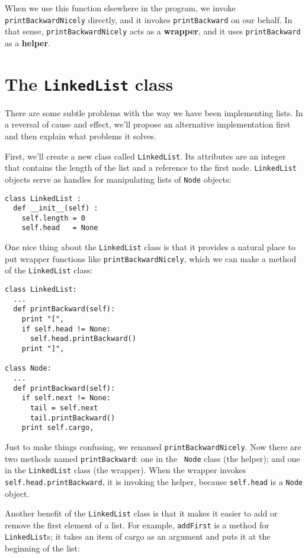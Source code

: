 When we use this function elsewhere in the program, we
invoke {\tt printBackwardNicely} directly, and it invokes
{\tt printBackward} on our behalf.  In that sense,
{\tt printBackwardNicely} acts as a {\bf wrapper}, and it uses
{\tt printBackward} as a {\bf helper}.


\section {The {\tt LinkedList} class}

There are some subtle problems with the way we have been
implementing lists.  In a reversal of cause and effect, we'll
propose an alternative implementation first and then explain what
problems it solves.

First, we'll create a new class called {\tt LinkedList}.  Its
attributes are an integer that contains the length of the list
and a reference to the first node.  {\tt LinkedList} objects
serve as handles for manipulating lists of {\tt Node} objects:

\beforeverb
\begin{verbatim}
class LinkedList :
  def __init__(self) :
    self.length = 0
    self.head   = None
\end{verbatim}
\afterverb
%
One nice thing about the {\tt LinkedList} class is that it provides
a natural place to put wrapper functions like
{\tt printBackwardNicely}, which we can make a
method of the {\tt LinkedList} class:

\beforeverb
\begin{verbatim}
class LinkedList:
  ...
  def printBackward(self):
    print "[",
    if self.head != None:
      self.head.printBackward()
    print "]",

class Node:
  ...
  def printBackward(self):
    if self.next != None:
      tail = self.next
      tail.printBackward()
    print self.cargo,
\end{verbatim}
\afterverb
%
Just to make things confusing, we renamed {\tt printBackwardNicely}.
Now there are two methods named {\tt printBackward}: one in the {\tt
Node} class (the helper); and one in the {\tt LinkedList} class (the
wrapper).  When the wrapper invokes {\tt self.head.printBackward},
it is invoking the helper, because {\tt self.head} is a
{\tt Node} object.

Another benefit of the {\tt LinkedList} class is that it
makes it easier to add or remove the first element of a list.  For
example, {\tt addFirst} is a method for {\tt LinkedList}s; it
takes an item of cargo as an argument and puts it at the beginning of the
list:

